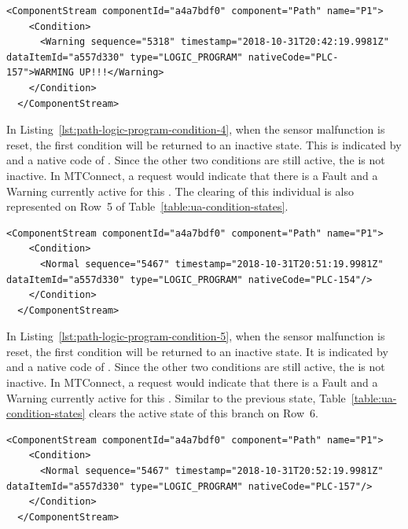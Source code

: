 \begin{lstlisting}[firstnumber=last,escapechar=|,%
    caption={Path Logic Program Warning PLC-157},label={lst:path-logic-program-condition-3}]
  <ComponentStream componentId="a4a7bdf0" component="Path" name="P1">
    <Condition>
      <Warning sequence="5318" timestamp="2018-10-31T20:42:19.9981Z" dataItemId="a557d330" type="LOGIC_PROGRAM" nativeCode="PLC-157">WARMING UP!!!</Warning>
    </Condition>
  </ComponentStream>
\end{lstlisting}

In Listing~\ref{lst:path-logic-program-condition-4}, when the sensor malfunction is reset, the first condition will be returned to an inactive state. This is indicated by  and a native code of . Since the other two conditions are still active, the  is not inactive. In MTConnect, a  request would indicate that there is a Fault and a Warning currently active for this . The clearing of this individual  is also represented on Row~5 of Table~\ref{table:ua-condition-states}.

\begin{lstlisting}[firstnumber=last,escapechar=|,%
    caption={Path Logic Program Clear Fault of PLC-154},label={lst:path-logic-program-condition-4}]
  <ComponentStream componentId="a4a7bdf0" component="Path" name="P1">
    <Condition>
      <Normal sequence="5467" timestamp="2018-10-31T20:51:19.9981Z" dataItemId="a557d330" type="LOGIC_PROGRAM" nativeCode="PLC-154"/>
    </Condition>
  </ComponentStream>
\end{lstlisting}

In Listing~\ref{lst:path-logic-program-condition-5}, when the sensor malfunction is reset, the first condition will be returned to an inactive state. It is indicated by  and a native code of . Since the other two conditions are still active, the  is not inactive. In MTConnect, a  request would indicate that there is a Fault and a Warning currently active for this . Similar to the previous state, Table~\ref{table:ua-condition-states} clears the active state of this branch on Row~6.

\begin{lstlisting}[firstnumber=last,escapechar=|,%
    caption={Path Logic Program Clear Warning PLC-157},label={lst:path-logic-program-condition-5}]
  <ComponentStream componentId="a4a7bdf0" component="Path" name="P1">
    <Condition>
      <Normal sequence="5467" timestamp="2018-10-31T20:52:19.9981Z" dataItemId="a557d330" type="LOGIC_PROGRAM" nativeCode="PLC-157"/>
    </Condition>
  </ComponentStream>
\end{lstlisting}

